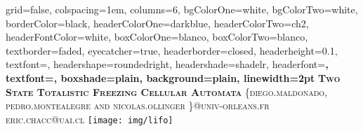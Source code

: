 \documentclass[lanscape,a0paper,fontscale=0.277]{baposter}
\begin{document}


\begin{poster}%
  {
  grid=false,
  colspacing=1em,
  columns=6,
  bgColorOne=white,
  bgColorTwo=white,
  borderColor=black,
  headerColorOne=darkblue,
  headerColorTwo=ch2,
  headerFontColor=white,
  boxColorOne=blanco,
  boxColorTwo=blanco,
  textborder=faded,
  eyecatcher=true,
  headerborder=closed,
  headerheight=0.1\textheight,
  textfont=\sc,%
  headershape=roundedright,
  headershade=shadelr,
  headerfont=\Large\bf\textsc, %
  textfont={\setlength{\parindent}{1.5em}},
  boxshade=plain,
  background=plain,
  linewidth=2pt
  }
  {} 
  {\bf\textsc{Two State Totalistic Freezing Cellular Automata}\vspace{0.5em}}
  {\textsc{\small \{diego.maldonado, pedro.montealegre and nicolas.ollinger \}@univ-orleans.fr\\ eric.chacc@uai.cl}}
  {%
    \texttt{[image: img/lifo]}
  }

    \newcommand{\colouredcircle}{%
      \tikz{\useasboundingbox (-0.2em,-0.32em) rectangle(0.2em,0.32em); \draw[draw=black,fill=lightblue,line width=0.03em] (0,0) circle(0.18em);}}


\end{poster}
\end{document}
